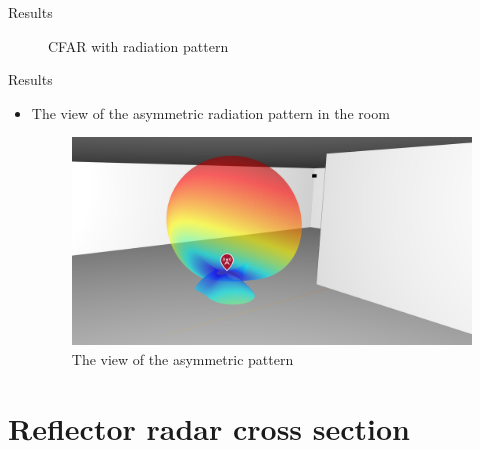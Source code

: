 \documentclass{beamer}
\newcounter{section}
\begin{document}
\begin{frame}[t]{Results}
\begin{itemize}
\begin{figure}
\begin{minipage}{0.45\textwidth}
                    \caption{CFAR with radiation pattern}
                \end{minipage}
            \end{figure}
	\end{itemize}
\end{frame}




\begin{frame}[t]{Results}
	\begin{itemize}
	    \item The view of the asymmetric radiation pattern in the room
        \vspace{1.0\baselineskip}
            \begin{figure}
            	\centering
            	\includegraphics[scale=.17]{figures/asymmetric_antenna.png}
            	\caption{The view of the asymmetric pattern}
            \end{figure}
	\end{itemize}
\end{frame}


\section{Reflector radar cross section}
\end{document}
